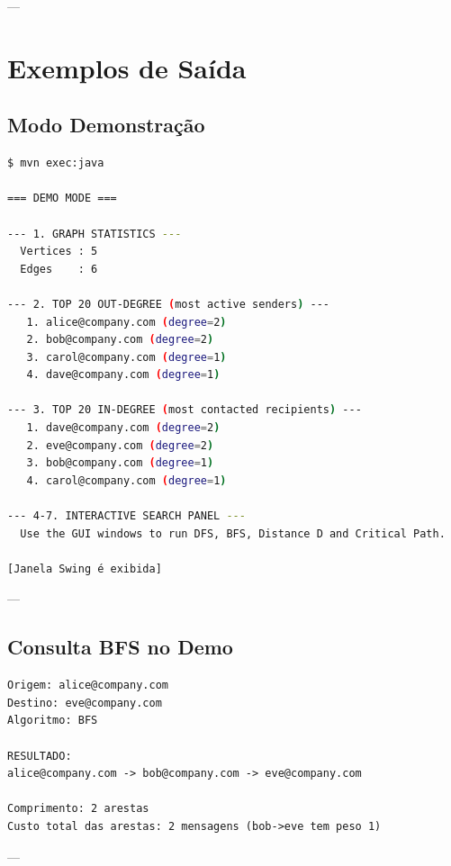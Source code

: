 \documentclass[12pt,openright,twoside,a4paper,english,brazilian,hidelinks]{abntex2}
\begin{document}
    ---

    \chapter{Exemplos de Saída}

    \section{Modo Demonstração}

    \begin{lstlisting}[language=bash]
$ mvn exec:java

=== DEMO MODE ===

--- 1. GRAPH STATISTICS ---
  Vertices : 5
  Edges    : 6

--- 2. TOP 20 OUT-DEGREE (most active senders) ---
   1. alice@company.com (degree=2)
   2. bob@company.com (degree=2)
   3. carol@company.com (degree=1)
   4. dave@company.com (degree=1)

--- 3. TOP 20 IN-DEGREE (most contacted recipients) ---
   1. dave@company.com (degree=2)
   2. eve@company.com (degree=2)
   3. bob@company.com (degree=1)
   4. carol@company.com (degree=1)

--- 4-7. INTERACTIVE SEARCH PANEL ---
  Use the GUI windows to run DFS, BFS, Distance D and Critical Path.

[Janela Swing é exibida]
    \end{lstlisting}

    ---

    \section{Consulta BFS no Demo}

    \begin{lstlisting}
Origem: alice@company.com
Destino: eve@company.com
Algoritmo: BFS

RESULTADO:
alice@company.com -> bob@company.com -> eve@company.com

Comprimento: 2 arestas
Custo total das arestas: 2 mensagens (bob->eve tem peso 1)
    \end{lstlisting}

    ---
\end{document}
